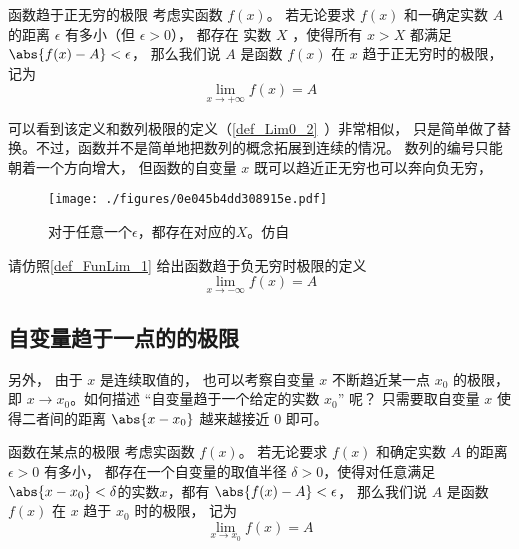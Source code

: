 \begin{definition}{函数趋于正无穷的极限}\label{def_FunLim_1}
考虑实函数 $f(x)$。 若无论要求 $f(x)$ 和一确定实数 $A$ 的距离 $\epsilon$ 有多小（但 $\epsilon>0$）， 都存在 实数 $X$ ，使得所有 $x>X$ 都满足 $\abs{f(x)-A}<\epsilon$， 那么我们说 $A$ 是函数 $f(x)$ 在 $x$ 趋于正无穷时的极限， 记为
\begin{equation}
\lim\limits_{x\to +\infty} f(x) = A
\end{equation}
\end{definition}

可以看到该定义和数列极限的定义（\autoref{def_Lim0_2}~）非常相似， 只是简单做了替换。不过，函数并不是简单地把数列的概念拓展到连续的情况。 数列的编号只能朝着一个方向增大， 但函数的自变量 $x$ 既可以趋近正无穷也可以奔向负无穷， 

\begin{figure}[ht]
\centering
\texttt{[image: ./figures/0e045b4dd308915e.pdf]}
\caption{对于任意一个$\epsilon$，都存在对应的$X$。仿自\cite{Thomas}} \label{fig_FunLim_5}
\end{figure}

\begin{exercise}{}
请仿照\autoref{def_FunLim_1} 给出函数趋于负无穷时极限的定义
\begin{equation}
\lim\limits_{x\to -\infty} f(x) = A
\end{equation}
\end{exercise}

\subsection{自变量趋于一点的的极限}
另外， 由于 $x$ 是连续取值的， 也可以考察自变量 $x$ 不断趋近某一点 $x_0$ 的极限， 即 $x\to x_0$。如何描述 “自变量趋于一个给定的实数 $x_0$” 呢？ 只需要取自变量 $x$ 使得二者间的距离 $\abs{x-x_0}$ 越来越接近 $0$ 即可。

\begin{definition}{函数在某点的极限}\label{def_FunLim_3}
考虑实函数 $f(x)$。 若无论要求 $f(x)$ 和确定实数 $A$ 的距离 $\epsilon>0$ 有多小， 都存在一个自变量的取值半径 $\delta>0$，使得对任意满足 $\abs{x-x_0} < \delta$的实数$x$，都有 $\abs{f(x)-A}<\epsilon$，
那么我们说 $A$ 是函数 $f(x)$ 在 $x$ 趋于 $x_0$ 时的极限， 记为
\begin{equation}
\lim\limits_{x\to x_0}f(x)=A
\end{equation}
\end{definition}

